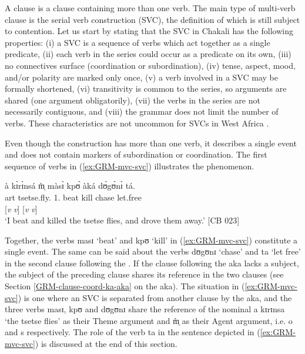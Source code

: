 A  clause is a clause containing more than one verb. The main type of
multi-verb clause is the serial verb construction (SVC), the definition of which
is still subject to contention. Let us start by stating that the SVC in Chakali
has the following properties: (i) a SVC is a sequence of verbs which act
together as a single predicate, (ii) each verb in the series could occur as a
predicate on its own, (iii)  no connectives  surface (coordination or
subordination), (iv)  tense, aspect, mood, and/or polarity are marked only once,
(v)  a verb involved in a SVC may be formally shortened,  (vi)  transitivity is
common to the series, so arguments are shared (one argument obligatorily), (vii)
the verbs in the series are not necessarily contiguous, and  (viii) the grammar
does not limit the number of verbs. These characteristics are not uncommon for 
SVCs in West Africa \citep{Amek05a}. 


Even though the construction has more than one
verb, it describes a single event and does not contain  markers of
subordination or coordination. The first sequence of verbs in
(\ref{ex:GRM-mvc-svc}) illustrates the phenomenon.



\ea\label{ex:GRM-mvc-svc}
\glll à  kɪ̀rɪ̀nsá   m̩̀   màsɪ̀   kpʊ́ àká dʊ̀gʊ̀nɪ̀ tá.\\
{\sc art}  tsetse.fly.{\pl}   {1.\sg}    beat   kill   {\conn} 
chase   let.free\\
 {} {} {}  [{\it v} {\it v}]  {} [{\it v} {\it v}]\\
\glt `I beat and killed the tsetse flies, and drove them away.' [CB 023]
\z

Together,  the verbs {\sls masɪ} `beat' and  {\sls kpʊ} `kill'  in 
(\ref{ex:GRM-mvc-svc})  constitute a single event.  The same can be said about 
the verbs {\sls dʊgʊnɪ} `chase' and {\sls ta} `let free' in the second clause
following the .   If the clause following the    {\sls aka}
lacks a subject,  the subject of the preceding clause shares its reference in
the two clauses   (see Section \ref{GRM-clause-coord-ka-aka} on the  
{\sls aka}). The situation in (\ref{ex:GRM-mvc-svc}) is one where an SVC is separated from
another  clause by the  {\sls aka},  and the three verbs 
{\sls 
masɪ},  {\sls kpʊ} and {\sls dʊgʊnɪ}  share the reference of the  nominal {\sls 
a
kɪrɪnsa} `the tsetse flies' as their Theme argument and {\sls m̩̀} as their 
Agent
argument, i.e. {\sc o} and {\sc s} respectively. The role of  the verb {\sls ta}
in the sentence depicted in  (\ref{ex:GRM-mvc-svc}) is discussed at the end of
this section.

